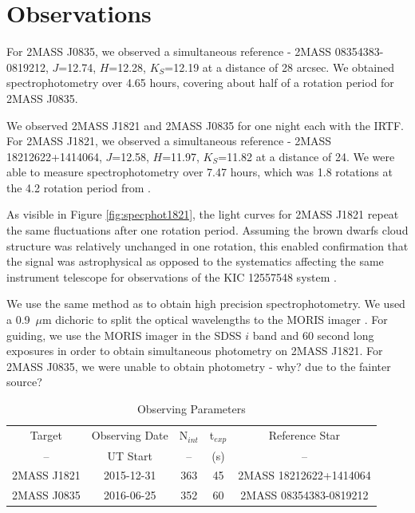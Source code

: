 \documentclass[twocolumn]{aastex6}
\begin{document}
\section{Observations}

For 2MASS J0835, we observed a simultaneous reference - 2MASS 08354383-0819212, $J$=12.74, $H$=12.28, $K_S$=12.19 at a distance of 28 arcsec.
We obtained spectrophotometry over 4.65 hours, covering about half of a rotation period for 2MASS J0835.

We observed 2MASS J1821 and 2MASS J0835 for one night each with the IRTF.
For 2MASS J1821, we observed a simultaneous reference - 2MASS 18212622+1414064, $J$=12.58, $H$=11.97, $K_S$=11.82  at a distance of 24\arcsec.
We were able to measure spectrophotometry over 7.47 hours, which was 1.8 rotations at the 4.2 rotation period from \citet{metchev2015weatherII}.

As visible in Figure \ref{fig:specphot1821}, the light curves for 2MASS J1821 repeat the same fluctuations after one rotation period.
Assuming the brown dwarfs cloud structure was relatively unchanged in one rotation, this enabled confirmation that the signal was astrophysical as opposed to the systematics affecting the same instrument telescope for observations of the  KIC 12557548 system \citep{schlawin2016kic1255}.



We use the same method as \citet{schlawin2014} to obtain high precision spectrophotometry.
We used a 0.9~$\mu$m dichoric to split the optical wavelengths to the MORIS imager \citep{Gulbis2011}.
For guiding, we use the MORIS imager in the SDSS $i$ band and 60 second long exposures in order to obtain simultaneous photometry on 2MASS J1821.
For 2MASS J0835, we were unable to obtain photometry - why? due to the fainter source?

\begin{table}
\begin{center}
\caption{Observing Parameters}\label{tab:obsParam}
\begin{tabular}{ccccc}
Target & Observing Date & N$_{int}$ & t$_{exp}$ & Reference Star \\
-- & UT Start & -- & (s) & -- \\
\hline
2MASS J1821 & 2015-12-31 & 363 & 45 & 2MASS 18212622+1414064 \\
2MASS J0835 & 2016-06-25 & 352 & 60 & 2MASS 08354383-0819212 \\
\end{tabular}
\end{center}
\tablenotetext{}{}
\end{table}
\end{document}
